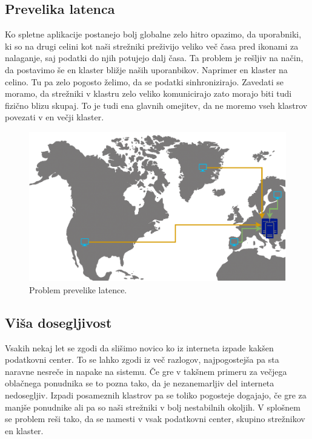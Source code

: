 \documentclass[a4paper, 12pt]{book}
\begin{document}
\subsection{Prevelika latenca}
Ko spletne aplikacije postanejo bolj globalne zelo hitro opazimo, da uporabniki, ki so na drugi celini kot naši strežniki preživijo veliko več časa pred ikonami za nalaganje, saj podatki do njih potujejo dalj časa.
Ta problem je rešljiv na način, da postavimo še en klaster bližje naših uporanbikov.
Naprimer en klaster na celino.
Tu pa zelo pogosto želimo, da se podatki sinhronizirajo.
Zavedati se moramo, da strežniki v klastru zelo veliko komunicirajo zato morajo biti tudi fizično blizu skupaj. 
To je tudi ena glavnih omejitev, da ne moremo vseh klastrov povezati v en večji klaster.
\begin{figure}[h]
\begin{center}
  \includegraphics[width=1.0\textwidth]{images/problem-prevelike-latence.pdf}
\end{center}
\caption{Problem prevelike latence.}
\label{problem-prevelike-latence}
\end{figure}
\subsection{Viša dosegljivost}
Vsakih nekaj let se zgodi da slišimo novico ko iz interneta izpade kakšen podatkovni center. 
To se lahko zgodi iz več razlogov, najpogostejša pa sta naravne nesreče in napake na sistemu.
Če gre v takšnem primeru za večjega oblačnega ponudnika se to pozna tako, da je nezanemarljiv del interneta nedosegljiv.
Izpadi posameznih klastrov pa se toliko pogosteje dogajajo, če gre za manjše ponudnike ali pa so naši strežniki v bolj nestabilnih okoljih. 
V splošnem se problem reši tako, da se namesti v vsak podatkovni center, skupino strežnikov en klaster.
\end{document}
